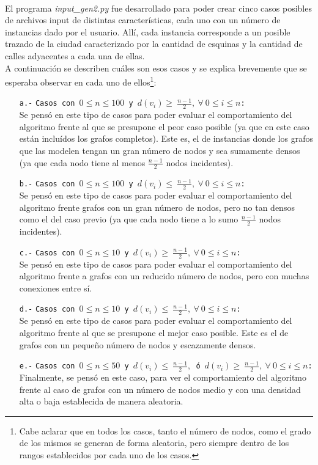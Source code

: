 \paragraph{}
El programa \textit{input\_gen2.py} fue desarrollado para poder crear cinco casos posibles de archivos input de distintas características, cada uno con un número de instancias dado por el usuario. Allí, cada instancia corresponde a un posible trazado de la ciudad caracterizado por la cantidad de esquinas y la cantidad de calles adyacentes a cada una de ellas. \\
A continuación se describen cuáles son esos casos y se explica brevemente que se esperaba observar en cada uno de ellos\footnote{Cabe aclarar que en todos los casos, tanto el número de nodos, como el grado de los mismos se generan de forma aleatoria, pero siempre dentro de los rangos establecidos por cada uno de los casos.}:
	\begin{itemize}
		\item[\texttt{a.-}]{\texttt{Casos con $0 \leq n \leq 100$ y $d(v_i) \geq\ \frac{n-1}{2},\ \forall\ 0 \leq i \leq n$:} \\
		Se pensó en este tipo de casos para poder evaluar el comportamiento del algoritmo frente al que se presupone el peor caso posible (ya que en este caso están incluídos los grafos completos). Este es, el de instancias donde los grafos que las modelen tengan un gran número de nodos y sea sumamente densos (ya que cada nodo tiene al menos $\frac{n-1}{2}$ nodos incidentes).} 
		\item[\texttt{b.-}]{\texttt{Casos con $0 \leq n \leq 100$ y $d(v_i) \leq\ \frac{n-1}{2},\ \forall\ 0 \leq i \leq n$:} \\
		Se pensó en este tipo de casos para poder evaluar el comportamiento del algoritmo frente grafos con un gran número de nodos, pero no tan densos como el del caso previo (ya que cada nodo tiene a lo sumo $\frac{n-1}{2}$ nodos incidentes).} 
		\item[\texttt{c.-}]{\texttt{Casos con $0 \leq n \leq 10$ y $d(v_i) \geq\ \frac{n-1}{2},\ \forall\ 0 \leq i \leq n$:} \\
		Se pensó en este tipo de casos para poder evaluar el comportamiento del algoritmo frente a grafos con un reducido número de nodos, pero con muchas conexiones entre sí.}
		\item[\texttt{d.-}]{\texttt{Casos con $0 \leq n \leq 10$ y $d(v_i) \leq\ \frac{n-1}{2},\ \forall\ 0 \leq i \leq n$:} \\
		Se pensó en este tipo de casos para poder evaluar el comportamiento del algoritmo frente al que se presupone el mejor caso posible. Este es el de grafos con un pequeño número de nodos y escazamente densos.} 
		\item[\texttt{e.-}]{\texttt{Casos con $0 \leq n \leq 50$ y $d(v_i) \leq\ \frac{n-1}{2},$ ó $d(v_i) \geq\ \frac{n-1}{2},\ \forall\ 0 \leq i \leq n$:} \\ 
		Finalmente, se pensó en este caso, para ver el comportamiento del algoritmo frente al caso de grafos con un número de nodos medio y con una densidad alta o baja establecida de manera aleatoria.}
	\end{itemize}  

